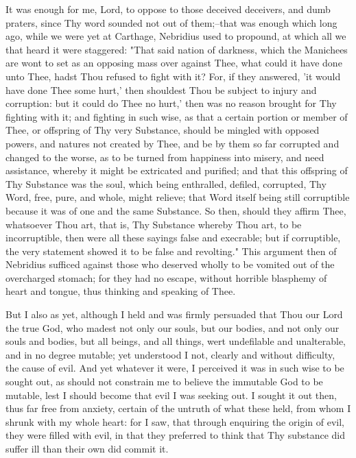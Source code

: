 \documentclass[b5paper,openright,12pt,twoside]{book}
\begin{document}
It was enough for me, Lord, to oppose to those deceived deceivers, and
dumb praters, since Thy word sounded not out of them;--that was enough
which long ago, while we were yet at Carthage, Nebridius used to
propound, at which all we that heard it were staggered: "That said
nation of darkness, which the Manichees are wont to set as an opposing
mass over against Thee, what could it have done unto Thee, hadst Thou
refused to fight with it? For, if they answered, 'it would have
done Thee some hurt,' then shouldest Thou be subject to injury and
corruption: but it could do Thee no hurt,' then was no reason brought
for Thy fighting with it; and fighting in such wise, as that a certain
portion or member of Thee, or offspring of Thy very Substance, should be
mingled with opposed powers, and natures not created by Thee, and be
by them so far corrupted and changed to the worse, as to be turned
from happiness into misery, and need assistance, whereby it might be
extricated and purified; and that this offspring of Thy Substance was
the soul, which being enthralled, defiled, corrupted, Thy Word, free,
pure, and whole, might relieve; that Word itself being still corruptible
because it was of one and the same Substance. So then, should they
affirm Thee, whatsoever Thou art, that is, Thy Substance whereby
Thou art, to be incorruptible, then were all these sayings false and
execrable; but if corruptible, the very statement showed it to be false
and revolting." This argument then of Nebridius sufficed against those
who deserved wholly to be vomited out of the overcharged stomach; for
they had no escape, without horrible blasphemy of heart and tongue, thus
thinking and speaking of Thee.

But I also as yet, although I held and was firmly persuaded that Thou
our Lord the true God, who madest not only our souls, but our bodies,
and not only our souls and bodies, but all beings, and all things, wert
undefilable and unalterable, and in no degree mutable; yet understood I
not, clearly and without difficulty, the cause of evil. And yet whatever
it were, I perceived it was in such wise to be sought out, as should not
constrain me to believe the immutable God to be mutable, lest I should
become that evil I was seeking out. I sought it out then, thus far free
from anxiety, certain of the untruth of what these held, from whom I
shrunk with my whole heart: for I saw, that through enquiring the origin
of evil, they were filled with evil, in that they preferred to think
that Thy substance did suffer ill than their own did commit it.
\end{document}
